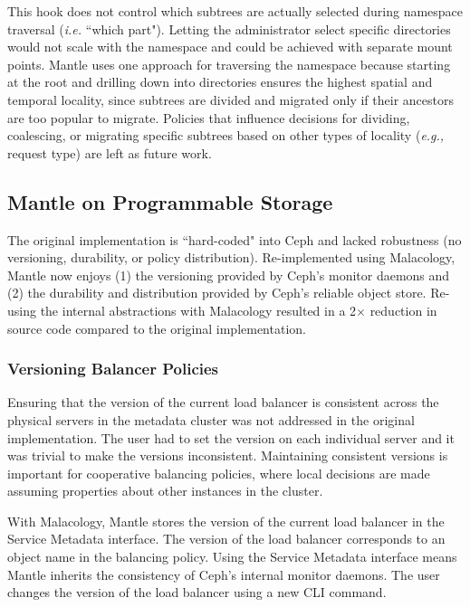 This hook does not control which subtrees are actually selected during namespace traversal ({\it i.e.} ``which part"). Letting the administrator select specific directories would not scale with the namespace and could be achieved with separate mount points. Mantle uses one approach for traversing the namespace because starting at the root and drilling down into directories ensures the highest spatial and temporal locality, since subtrees are divided and migrated only if their ancestors are too popular to migrate. Policies that influence decisions for dividing, coalescing, or migrating specific subtrees based on other types of locality ({\it e.g.,} request type) are left as future work.

\subsection{Mantle on Programmable Storage}
\label{sec:mantle-progstorage}

The original implementation is ``hard-coded" into Ceph and lacked robustness
(no versioning, durability, or policy distribution).  Re-implemented using
Malacology, Mantle now enjoys (1) the versioning provided by Ceph's monitor
daemons and (2) the durability and distribution provided by Ceph's reliable
object store.  Re-using the internal abstractions with Malacology resulted in a
2\(\times\) reduction in source code compared to the original implementation.

\subsubsection{Versioning Balancer Policies}

Ensuring that the version of the current load balancer is consistent across the
physical servers in the metadata cluster was not addressed in the original
implementation. The user had to set the version on each individual server and
it was trivial to make the versions inconsistent. Maintaining consistent
versions is important for cooperative balancing policies, where local decisions
are made assuming properties about other instances in the cluster.

With Malacology, Mantle stores the version of the current load balancer in the
Service Metadata interface. The version of the load balancer corresponds to an
object name in the balancing policy. Using the Service Metadata interface means
Mantle inherits the consistency of Ceph's internal monitor daemons. The user
changes the version of the load balancer using a new CLI command.

